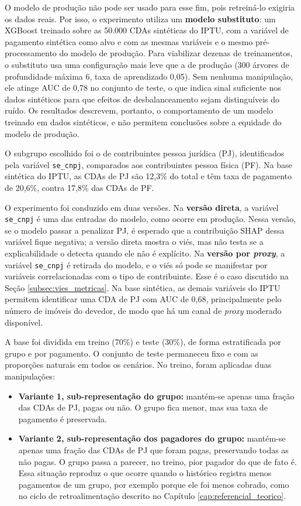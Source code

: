 O modelo de produção não pode ser usado para esse fim, pois retreiná-lo exigiria os dados reais. Por isso, o experimento utiliza um \textbf{modelo substituto}: um XGBoost treinado sobre as 50.000 CDAs sintéticas do IPTU, com a variável de pagamento sintética como alvo e com as mesmas variáveis e o mesmo pré-processamento do modelo de produção. Para viabilizar dezenas de treinamentos, o substituto usa uma configuração mais leve que a de produção (300 árvores de profundidade máxima 6, taxa de aprendizado 0,05). Sem nenhuma manipulação, ele atinge AUC de 0,78 no conjunto de teste, o que indica sinal suficiente nos dados sintéticos para que efeitos de desbalanceamento sejam distinguíveis do ruído. Os resultados descrevem, portanto, o comportamento de um modelo treinado em dados sintéticos, e não permitem conclusões sobre a equidade do modelo de produção.

O subgrupo escolhido foi o de contribuintes pessoa jurídica (PJ), identificados pela variável \texttt{se\_cnpj}, comparados aos contribuintes pessoa física (PF). Na base sintética do IPTU, as CDAs de PJ são 12,3\% do total e têm taxa de pagamento de 20,6\%, contra 17,8\% das CDAs de PF.

O experimento foi conduzido em duas versões. Na \textbf{versão direta}, a variável \texttt{se\_cnpj} é uma das entradas do modelo, como ocorre em produção. Nessa versão, se o modelo passar a penalizar PJ, é esperado que a contribuição SHAP dessa variável fique negativa; a versão direta mostra o viés, mas não testa se a explicabilidade o detecta quando ele não é explícito. Na \textbf{versão por \textit{proxy}}, a variável \texttt{se\_cnpj} é retirada do modelo, e o viés só pode se manifestar por variáveis correlacionadas com o tipo de contribuinte. Esse é o caso discutido na Seção \ref{subsec:vies_metricas}. Na base sintética, as demais variáveis do IPTU permitem identificar uma CDA de PJ com AUC de 0,68, principalmente pelo número de imóveis do devedor, de modo que há um canal de \textit{proxy} moderado disponível.

A base foi dividida em treino (70\%) e teste (30\%), de forma estratificada por grupo e por pagamento. O conjunto de teste permaneceu fixo e com as proporções naturais em todos os cenários. No treino, foram aplicadas duas manipulações:

\begin{itemize}
    \item \textbf{Variante 1, sub-representação do grupo:} mantém-se apenas uma fração das CDAs de PJ, pagas ou não. O grupo fica menor, mas sua taxa de pagamento é preservada.
    \item \textbf{Variante 2, sub-representação dos pagadores do grupo:} mantém-se apenas uma fração das CDAs de PJ que foram pagas, preservando todas as não pagas. O grupo passa a parecer, no treino, pior pagador do que de fato é. Essa situação reproduz o que ocorre quando o histórico registra menos pagamentos de um grupo, por exemplo porque ele foi menos cobrado, como no ciclo de retroalimentação descrito no Capítulo \ref{cap:referencial_teorico}.
\end{itemize}

